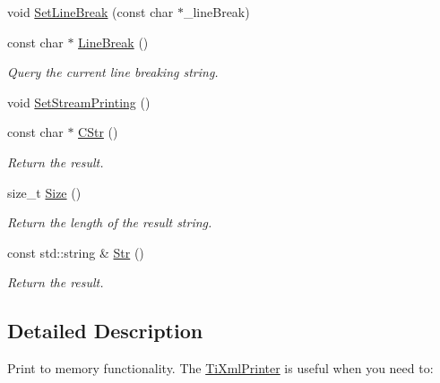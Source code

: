 \begin{DoxyCompactItemize}
void \hyperlink{class_ti_xml_printer_a4be1e37e69e3858c59635aa947174fe6}{Set\+Line\+Break} (const char $\ast$\+\_\+line\+Break)
\item 
\mbox{\label{class_ti_xml_printer_a11f1b4804a460b175ec244eb5724d96d}} 
const char $\ast$ \hyperlink{class_ti_xml_printer_a11f1b4804a460b175ec244eb5724d96d}{Line\+Break} ()
\begin{DoxyCompactList}\small\item\em Query the current line breaking string. \end{DoxyCompactList}\item 
void \hyperlink{class_ti_xml_printer_ab23a90629e374cb1cadca090468bbd19}{Set\+Stream\+Printing} ()
\item 
\mbox{\label{class_ti_xml_printer_a859eede9597d3e0355b77757be48735e}} 
const char $\ast$ \hyperlink{class_ti_xml_printer_a859eede9597d3e0355b77757be48735e}{C\+Str} ()
\begin{DoxyCompactList}\small\item\em Return the result. \end{DoxyCompactList}\item 
\mbox{\label{class_ti_xml_printer_ad01375ae9199bd2f48252eaddce3039d}} 
size\+\_\+t \hyperlink{class_ti_xml_printer_ad01375ae9199bd2f48252eaddce3039d}{Size} ()
\begin{DoxyCompactList}\small\item\em Return the length of the result string. \end{DoxyCompactList}\item 
\mbox{\label{class_ti_xml_printer_a3bd4daf44309b41f5813a833caa0d1c9}} 
const std\+::string \& \hyperlink{class_ti_xml_printer_a3bd4daf44309b41f5813a833caa0d1c9}{Str} ()
\begin{DoxyCompactList}\small\item\em Return the result. \end{DoxyCompactList}\end{DoxyCompactItemize}


\subsection{Detailed Description}
Print to memory functionality. The \hyperlink{class_ti_xml_printer}{Ti\+Xml\+Printer} is useful when you need to\+:


